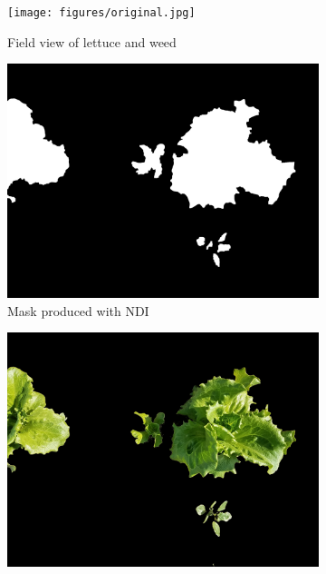 \documentclass[letterpaper]{article}
\begin{document}
{{\begin{figure}[H]
	\centering
	\begin{subfigure}[h]{.30\textwidth}
	  \centering
	  \texttt{[image: figures/original.jpg]}
	  \caption{Field view of lettuce and weed}
	  \label{fig:original}
	\end{subfigure}
	\begin{subfigure}[h]{.30\textwidth}
	  \centering
	  \includegraphics[width=1\linewidth]{figures/original-mask.jpg}
	  \caption{Mask produced with NDI}
	  \label{fig:mask}
	\end{subfigure}
	\begin{subfigure}[h]{.30\textwidth}
	  \centering
	  \includegraphics[width=1\linewidth]{figures/original-masked.jpg}

\end{subfigure}
\end{figure}}}
\end{document}
